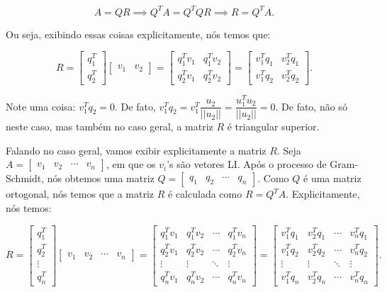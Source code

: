 $$
A = QR\implies Q^TA = Q^TQR\implies R = Q^TA.
$$

Ou seja, exibindo essas coisas explicitamente, nós temos que:

$$
R = \begin{bmatrix}
	q_1^T \\
	q_2^T
\end{bmatrix}\begin{bmatrix}
	v_1 & v_2
\end{bmatrix} = \begin{bmatrix}
	q_1^Tv_1 & q_1^Tv_2 \\
	q_2^Tv_1 & q_2^Tv_2
\end{bmatrix} = \begin{bmatrix}
	v_1^Tq_1 & v_2^Tq_1 \\
	v_1^Tq_2 & v_2^Tq_2
\end{bmatrix}.
$$

Note uma coisa: $v_1^Tq_2 = 0$. De fato, $v_1^Tq_2 = v_1^T\dfrac{u_2}{||u_2||} = \dfrac{u_1^Tu_2}{||u_2||} = 0$. De fato, não só neste caso, mas também no caso geral, a matriz $R$ é triangular superior.

Falando no caso geral, vamos exibir explicitamente a matriz $R$. Seja $A = \begin{bmatrix}
	v_1 & v_2 & \cdots & v_n
\end{bmatrix}$, em que os $v_i$'s são vetores LI. Após o processo de Gram-Schmidt, nós obtemos uma matriz $Q = \begin{bmatrix}
	q_1 & q_2 & \cdots & q_n
\end{bmatrix}$. Como $Q$ é uma matriz ortogonal, nós temos que a matriz $R$ é calculada como $R = Q^TA$. Explicitamente, nós temos:

$$
R = \begin{bmatrix}
	q_1^T \\
	q_2^T \\
	\vdots \\
	q_n^T
\end{bmatrix}\begin{bmatrix}
	v_1 & v_2 & \cdots & v_n
\end{bmatrix} = \begin{bmatrix}
	q_1^Tv_1 & q_1^Tv_2 & \cdots & q_1^Tv_n \\
	q_2^Tv_1 & q_2^Tv_2 & \cdots & q_2^Tv_n \\
	\vdots & \vdots & \ddots & \vdots \\
	q_n^Tv_1 & q_n^Tv_2 & \cdots & q_n^Tv_n
\end{bmatrix} = \begin{bmatrix}
	v_1^Tq_1 & v_2^Tq_1 & \cdots & v_n^Tq_1 \\
	v_1^Tq_2 & v_2^Tq_2 & \cdots & v_n^Tq_2 \\
	\vdots & \vdots & \ddots & \vdots \\
	v_1^Tq_n & v_2^Tq_n & \cdots & v_n^Tq_n
\end{bmatrix}.
$$

